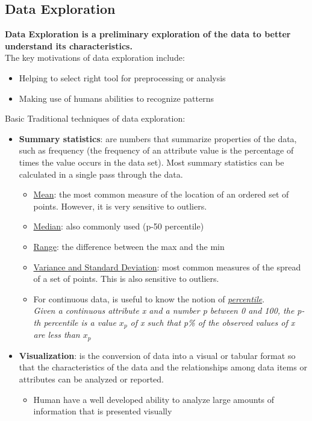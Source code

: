 \documentclass[10pt,a4paper]{article}
\begin{document}
\begin{justify}
\subsection{Data Exploration}
\textbf{Data Exploration is a preliminary exploration of the data to better understand its characteristics.}\\ The key motivations of data exploration include:
\begin{itemize}
	\item Helping to select right tool for preprocessing or analysis
	 \item Making use of humans abilities to recognize patterns
\end{itemize}
Basic Traditional techniques of data exploration:
\begin{itemize}
	\item \textbf{Summary statistics}: are numbers that summarize properties of the data, such as frequency (the frequency of an attribute value is the percentage of times the value occurs in the data set). Most summary statistics can be calculated in a single pass through the data.
	\begin{itemize}
		\item \uline{Mean}: the most common measure of the location of an ordered set of points. However, it is very sensitive to outliers.
		\item \uline{Median}: also commonly used (p-50 percentile)
		\item \uline{Range}: the difference between the max and the min
		\item \uline{Variance and Standard Deviation}: most common measures of the spread of a set of points. This is also sensitive to outliers.
		\item For continuous data, is useful to know the notion of \uline{\textit{percentile}}. \\ 
	\textit{Given a continuous attribute x and a number p between 0 and 100, the p-th percentile is a value $x_p$ of x such that p\% of the observed values of x are less than $x_p$} 
\end{itemize}	
	\item \textbf{Visualization}: is the conversion of data into a visual or tabular format so that the characteristics of the data and the relationships among data items or attributes can be analyzed or reported. 
	\begin{itemize}
			\item Human have a well developed ability to analyze large amounts of information that is presented visually

\end{itemize}
\end{itemize}
\end{justify}
\end{document}
